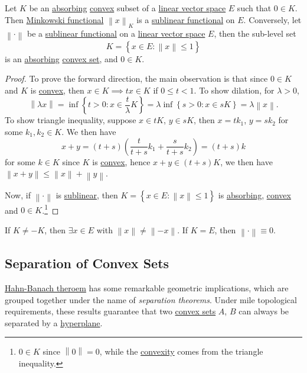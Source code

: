\begin{proposition}
	Let \(K\) be an \hyperref[def:absorbing]{absorbing} \hyperref[def:convex-set]{convex} subset of a \hyperref[def:linear-vector-space]{linear vector space} \(E\) such that \(0\in K\). Then \hyperref[def:Minkowski-functional]{Minkowski functional} \(\left\lVert x\right\rVert _K\) is a \hyperref[def:sublinear]{sublinear functional} on \(E\). Conversely, let \(\left\lVert \cdot\right\rVert \) be a \hyperref[def:sublinear]{sublinear functional} on a \hyperref[def:linear-vector-space]{linear vector space} \(E\), then the sub-level set
	\[
		K = \left\{ x\in E\colon \left\lVert x\right\rVert \leq 1 \right\}
	\]
	is an \hyperref[def:absorbing]{absorbing} \hyperref[def:convex-set]{convex set}, and \(0\in K\).
\end{proposition}
\begin{proof}
	To prove the forward direction, the main observation is that since \(0\in K\) and \(K\) is \hyperref[def:convex-set]{convex}, then \(x\in K \implies tx\in K\) if \(0 \leq t < 1\). To show dilation, for \(\lambda > 0\),
	\[
		\left\lVert \lambda x\right\rVert
		= \inf \left\{ t> 0\colon x \in \frac{t}{\lambda }K \right\}
		= \lambda \inf \left\{ s > 0\colon x \in sK \right\} = \lambda \left\lVert x\right\rVert.
	\]
	To show triangle inequality, suppose \(x\in tK\), \(y\in sK\), then \(x = tk_1\), \(y = sk_2\) for some \(k_1, k_2\in K\). We then have
	\[
		x + y = (t + s) \left( \frac{t}{t+s}k_1 + \frac{s}{t+s}k_2 \right) = (t + s) k
	\]
	for some \(k\in K\) since \(K\) is \hyperref[def:convex-set]{convex}, hence \(x + y \in (t + s) K\), we then have \(\left\lVert x + y\right\rVert \leq \left\lVert x\right\rVert + \left\lVert y\right\rVert \).

	Now, if \(\left\lVert \cdot\right\rVert \) is \hyperref[def:sublinear]{sublinear}, then \(K = \left\{ x\in E\colon \left\lVert x\right\rVert \leq 1 \right\} \) is \hyperref[def:absorbing]{absorbing}, \hyperref[def:convex-set]{convex} and \(0\in K\).\footnote{\(0\in K\) since \(\left\lVert 0\right\rVert = 0\), while the \hyperref[def:convex-set]{convexity} comes from the triangle inequality.}
\end{proof}

\begin{remark}
	If \(K \neq -K\), then \(\exists x\in E\) with \(\left\lVert x\right\rVert \neq \left\lVert -x\right\rVert \). If \(K = E\), then \(\left\lVert \cdot \right\rVert \equiv 0\).
\end{remark}

\subsection{Separation of Convex Sets}
\hyperref[thm:Hahn-Banach]{Hahn-Banach theroem} has some remarkable geometric implications, which are grouped together under the name of \emph{separation theorems}. Under mile topological requirements, these results guarantee that two \hyperref[def:convex-set]{convex sets} \(A\), \(B\) can always be separated by a \hyperref[def:hyperplane]{hyperplane}.

